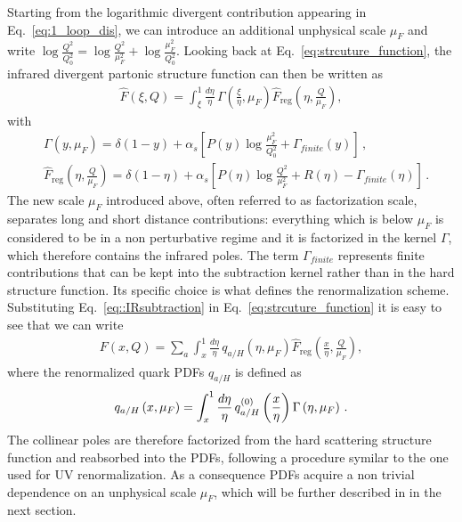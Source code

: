 %
Starting from the logarithmic divergent contribution appearing in Eq.~\eqref{eq:1_loop_dis}, we can introduce an
additional unphysical scale $\mu_F$ and write
$\log\frac{Q^2}{Q_0^2} = \log\frac{Q^2}{\mu_F^2} + \log\frac{\mu_F^2}{Q_0^2} $.
Looking back at Eq.~\eqref{eq:strcuture_function},
the infrared divergent partonic structure function can then be written as
\begin{align}
  \label{eq::IRsubtraction}
  \hat{F}\left(\xi,Q\right) = 
  \int_{\xi}^1 \frac{d\eta}{\eta} \,\Gamma\left(\frac{\xi}{\eta},\mu_F\right)
  \hat{F}_{\text{reg}}\left(\eta,\frac{Q}{\mu_F}\right) ,
\end{align}
with
\begin{align}
    &\Gamma\left(y,\mu_F\right) = \delta\left(1-y\right) 
    + \alpha_s\left[P\left(y\right)\log\frac{\mu_F^2}{Q_0^2} + \Gamma_{finite}\left(y\right)\right]\,, \\
    &\hat{F}_{\text{reg}}\left(\eta,\frac{Q}{\mu_F}\right) = \delta\left(1-\eta\right)  
    + \alpha_s
    \left[P\left(\eta\right)\log\frac{Q^2}{\mu_F^2}+ R\left(\eta\right) - \Gamma_{finite}\left(\eta\right) \right]\,.  
\end{align}
The new scale $\mu_F$ introduced above, often referred to as factorization scale, separates long and short distance 
contributions: everything which is below $\mu_F$ is considered to be in a non perturbative regime 
and it is factorized in the kernel $\Gamma$, which therefore contains the infrared poles.
The term $\Gamma_{finite}$ represents finite contributions that can be
kept into the subtraction kernel rather than in the hard structure function. Its specific choice is what defines
the renormalization scheme.  
Substituting Eq.~\eqref{eq::IRsubtraction} in Eq.~\eqref{eq:strcuture_function} it is easy to see that
we can write
\begin{align}
  F\left(x,Q\right) = \sum_a\int_x^1 \frac{d\eta}{\eta}\, 
  q_{a/H}\left(\eta,\mu_F\right)\hat{F}_{\text{reg}}\left(\frac{x}{\eta},\frac{Q}{\mu_F}\right),
\end{align}
where the renormalized quark PDFs $q_{a/H}$ is defined as
\begin{align}
    \label{eq:renormalized_pdf}
    q_{a/H}\left(x,\mu_F\right) = \int_x^1 \frac{d\eta}{\eta} \,
    q^{{(0)}}_{a/H}\left(\frac{x}{\eta}\right)\Gamma\left(\eta, \mu_F\right)\,.
\end{align}
The collinear poles are therefore factorized from the hard scattering structure function and reabsorbed into
the PDFs, following a procedure symilar to the one used for UV renormalization.
As a consequence PDFs acquire a non trivial dependence on an unphysical scale $\mu_F$,
which will be further described in in the next section.

